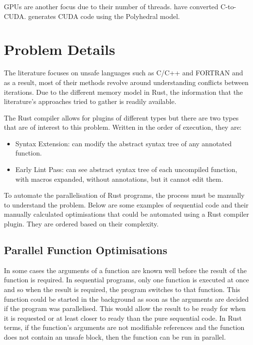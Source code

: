 \documentclass[conference]{IEEEtran}
\begin{document}
GPUs are another focus due to their number of threads.
\textcite{Baskaran2010} have converted C-to-CUDA.
\textcite{Verdoolaege2013} generates CUDA code using the Polyhedral model.

\section{Problem Details}

The literature focuses on unsafe languages such as C/C++ and FORTRAN and as a result, most of their methods revolve around understanding conflicts between iterations. Due to the different memory model in Rust, the information that the literature's approaches tried to gather is readily available.

The Rust compiler allows for plugins of different types but there are two types that are of interest to this problem. Written in the order of execution, they are:
\begin{itemize}
    \item Syntax Extension: can modify the abstract syntax tree of any annotated function.
    \item Early Lint Pass: can see abstract syntax tree of each uncompiled function, with macros expanded, without annotations, but it cannot edit them.
\end{itemize}

To automate the parallelisation of Rust programs, the process must be manually to understand the problem. Below are some examples of sequential code and their manually calculated optimisations that could be automated using a Rust compiler plugin. They are ordered based on their complexity.


\subsection{Parallel Function Optimisations}
In some cases the arguments of a function are known well before the result of the function is required. In sequential programs, only one function is executed at once and so when the result is required, the program switches to that function. This function could be started in the background as soon as the arguments are decided if the program was parallelised. This would allow the result to be ready for when it is requested or at least closer to ready than the pure sequential code.
In Rust terms, if the function's arguments are not modifiable references and the function does not contain an unsafe block, then the function can be run in parallel.
\end{document}
